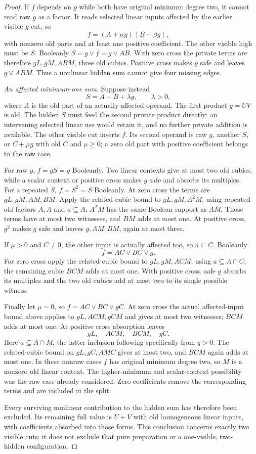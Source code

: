 \documentclass[11pt]{article}
\theoremstyle{definition}
\theoremstyle{remark}
\begin{document}
\begin{proof}
If $f$ depends on $g$ while both have original minimum degree two, it cannot read raw $g$ as a factor. It reads selected linear inputs affected by the earlier visible $g$ cut, so
\[
 f=(A+\alpha g)(B+\beta g),
\]
with nonzero old parts and at least one positive coefficient. The other visible high must be $S$. Booleanly $S=g\vee f=g\vee AB$. With zero cross the private terms are therefore $gL,gM,ABM$, three old cubics. Positive cross makes $g$ safe and leaves $g\vee ABM$. Thus a nonlinear hidden sum cannot give four missing edges.

\emph{An affected minimum-one sum.} Suppose instead
\[
 S=A+B+\lambda g,\qquad \lambda>0,
\]
where $A$ is the old part of an actually affected operand. The first product $g=UV$ is old. The hidden $S$ must feed the second private product directly: an intervening selected linear use would retain it, and no further private addition is available. The other visible cut inserts $f$. Its second operand is raw $g$, another $S$, or $C+\mu g$ with old $C$ and $\mu\ge0$; a zero old part with positive coefficient belongs to the raw case.

For raw $g$, $f=gS=g$ Booleanly. Two linear contexts give at most two old cubics, while a scalar context or positive cross makes $g$ safe and absorbs its multiples. For a repeated $S$, $f=S^2=S$ Booleanly. At zero cross the terms are $gL,gM,AM,BM$. Apply the related-cubic bound to $gL,gM,A^2M$, using repeated old factors $A,A$ and $a\subseteq A$; $A^2M$ has the same Boolean support as $AM$. Those terms have at most two witnesses, and $BM$ adds at most one. At positive cross, $g^2$ makes $g$ safe and leaves $g,AM,BM$, again at most three.

If $\mu>0$ and $C\ne0$, the other input is actually affected too, so $a\subseteq C$. Booleanly
\[
 f=AC\vee BC\vee g.
\]
For zero cross apply the related-cubic bound to $gL,gM,ACM$, using $a\subseteq A\cap C$; the remaining cubic $BCM$ adds at most one. With positive cross, safe $g$ absorbs its multiples and the two old cubics add at most two to its single possible witness.

Finally let $\mu=0$, so $f=AC\vee BC\vee gC$. At zero cross the actual affected-input bound above applies to $gL,ACM,gCM$ and gives at most two witnesses; $BCM$ adds at most one. At positive cross absorption leaves
\[
 gL,\quad ACM,\quad BCM,\quad gC.
\]
Here $a\subseteq A\cap M$, the latter inclusion following specifically from $q>0$. The related-cubic bound on $gL,gC,AMC$ gives at most two, and $BCM$ again adds at most one. In these nonraw cases $f$ has original minimum degree two, so $M$ is a nonzero old linear context. The higher-minimum and scalar-context possibility was the raw case already considered. Zero coefficients remove the corresponding terms and are included in the split.

Every surviving nonlinear contribution to the hidden sum has therefore been excluded. Its remaining full value is $U+V$ with old homogeneous linear inputs, with coefficients absorbed into those forms. This conclusion concerns exactly two visible cuts; it does not exclude that pure preparation or a one-visible, two-hidden configuration.
\end{proof}
\end{document}
